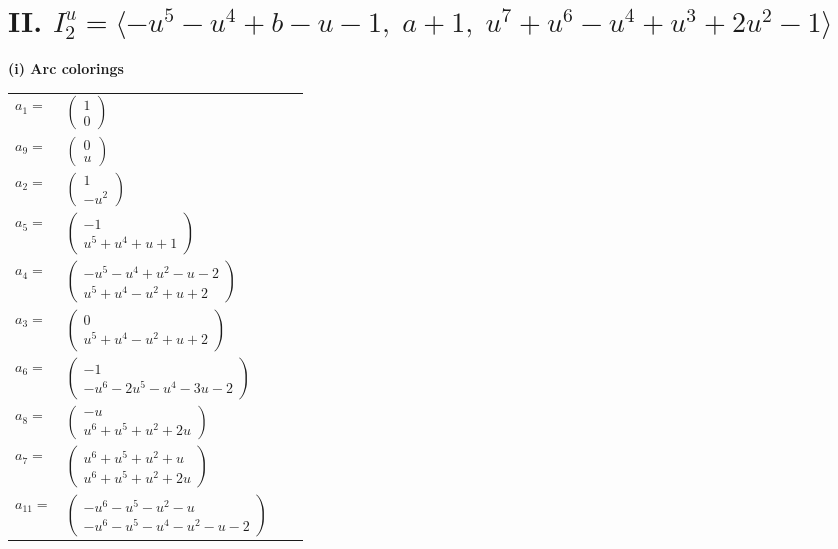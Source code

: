 \documentclass[1p]{elsarticle_modified}
\theoremstyle{definition}
\begin{document}
\centering \section*{II. $I^u_{2}= \langle - u^5- u^4+b- u-1,\;a+1,\;u^7+u^6- u^4+u^3+2 u^2-1 \rangle$}
\flushleft \textbf{(i) Arc colorings}\\
\begin{tabular}{m{7pt} m{180pt} m{7pt} m{180pt} }
\flushright $a_{1}=$&$\begin{pmatrix}1\\0\end{pmatrix}$ \\
\flushright $a_{9}=$&$\begin{pmatrix}0\\u\end{pmatrix}$ \\
\flushright $a_{2}=$&$\begin{pmatrix}1\\- u^2\end{pmatrix}$ \\
\flushright $a_{5}=$&$\begin{pmatrix}-1\\u^5+u^4+u+1\end{pmatrix}$ \\
\flushright $a_{4}=$&$\begin{pmatrix}- u^5- u^4+u^2- u-2\\u^5+u^4- u^2+u+2\end{pmatrix}$ \\
\flushright $a_{3}=$&$\begin{pmatrix}0\\u^5+u^4- u^2+u+2\end{pmatrix}$ \\
\flushright $a_{6}=$&$\begin{pmatrix}-1\\- u^6-2 u^5- u^4-3 u-2\end{pmatrix}$ \\
\flushright $a_{8}=$&$\begin{pmatrix}- u\\u^6+u^5+u^2+2 u\end{pmatrix}$ \\
\flushright $a_{7}=$&$\begin{pmatrix}u^6+u^5+u^2+u\\u^6+u^5+u^2+2 u\end{pmatrix}$ \\
\flushright $a_{11}=$&$\begin{pmatrix}- u^6- u^5- u^2- u\\- u^6- u^5- u^4- u^2- u-2\end{pmatrix}$ \\

\end{tabular}
\end{document}
